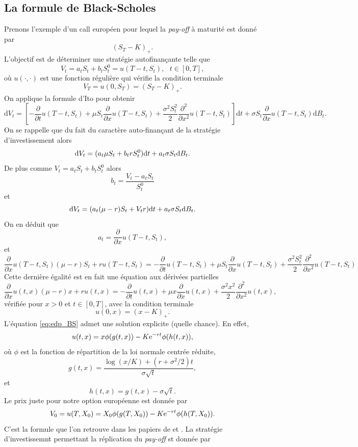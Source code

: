 \subsection{La formule de Black-Scholes}
Prenons l'exemple d'un call européen pour lequel la \textit{pay-off} à maturité est donné par 
$$
(S_T-K)_+.
$$
L'objectif est de déterminer une stratégie autofinançante telle que 
$$
V_t = a_t S_t + b_t S^0_t = u(T-t, S_t),\text{ }t\in [0, T],
$$
où $u(\cdot, \cdot)$ est une fonction régulière qui vérifie la condition terminale 
$$
V_T = u(0,S_T) = (S_T-K)_+.
$$
On applique la formule d'Ito pour obtenir 
$$
\text{d}V_t = \left[-\frac{\partial}{\partial t}u(T-t, S_t) + \mu S_t\frac{\partial}{\partial x}u(T-t, S_t) + \frac{\sigma^2 S_t^2}{2}\frac{\partial^2}{\partial x^2}u(T-t, S_t)\right]\text{d}t + \sigma S_t\frac{\partial}{\partial x}u(T-t, S_t)\text{d}B_t.
$$
On se rappelle que du fait du caractère auto-finançant de la stratégie d'investissement alors
$$
\text{d} V_t = (a_t\mu S_t + b_tr S_t^0)\text{d} t  + a_t \sigma S_t \text{d} B_t.
$$
De plus comme $V_t = a_t S_t + b_t S^0_t$ alors 
$$
b_t = \frac{V_t - a_t S_t}{S^0_t}
$$
et 
$$
\text{d} V_t = (a_t(\mu - r)S_t + V_t r )\text{d} t  + a_t \sigma S_t \text{d} B_t.
$$
On en déduit que 
$$
a_t = \frac{\partial}{\partial x}u(T-t, S_t),
$$
et 
\begin{equation*}
\frac{\partial}{\partial x}u(T-t, S_t)(\mu - r)S_t + r u(T-t, S_t) = -\frac{\partial}{\partial t}u(T-t, S_t) + \mu S_t\frac{\partial}{\partial x}u(T-t, S_t) + \frac{\sigma^2 S_t^2}{2}\frac{\partial^2}{\partial x^2}u(T-t, S_t)
\end{equation*}
Cette dernière égalité est en fait une équation aux dérivées partielles
\begin{equation}\label{eq:edp_BS}
\frac{\partial}{\partial x}u(t, x)(\mu - r)x + r u(t, x) = -\frac{\partial}{\partial t}u(t, x) + \mu x\frac{\partial}{\partial x}u(t, x) + \frac{\sigma^2 x^2}{2}\frac{\partial^2}{\partial x^2}u(t, x),
\end{equation}
vérifiée pour $x>0$ et $t\in[0,T]$, avec la condition terminale 
$$
u(0,x) = (x-K)_+.
$$
L'équation \eqref{eq:edp_BS} admet une solution explicite (quelle chance). En effet, 
$$
u(t,x) = x\phi(g(t,x)) - K\mathrm{e}^{-rt}\phi(h(t,x)),
$$
où $\phi$ est la fonction de répartition de la loi normale centrée réduite, 
$$
g(t,x) = \frac{\log(x/K) + (r+\sigma^2/2)t}{\sigma \sqrt{t}},
$$
et 
$$
h(t,x) = g(t,x) - \sigma\sqrt{t}.
$$
Le prix juste pour notre option européenne est donnée par 
$$
V_0 = u(T, X_0) = X_0\phi(g(T,X_0)) - K\mathrm{e}^{-rt}\phi(h(T,X_0)).
$$
C'est la formule que l'on retrouve dans les papiers de \citet{Black1973} et \citet{Merton1973}. La stratégie d'investissemnt permettant la réplication du \textit{pay-off} st donnée par 
